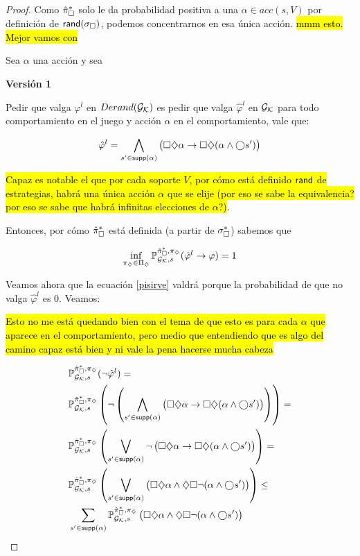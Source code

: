 \begin{proof}
	Como $\hat{\pi}_{\square}^{*}$ solo le da probabilidad positiva a una $\alpha \in acc(s, V)$
	por definición de $\textsf{rand}(\sigma_\square)$, podemos concentrarnos en esa única
	acción. \hl{mmm esto. Mejor vamos con}

	Sea $\alpha$ una acción y sea

	\textbf{Versión 1}

	Pedir que valga $\varphi^l$ en $Derand(\mathcal{G}_{\mathcal{K}})$ es pedir que valga $\hat{\varphi}^l$ en
	$\mathcal{G}_{\mathcal{K}}$ para todo comportamiento en el juego y acción $\alpha$ en el
	comportamiento, vale que:

	$$
		\hat{\varphi}^l = \bigwedge_{s' \in \textsf{supp}(\alpha)} \left( \square \diamondsuit \alpha \rightarrow \square \diamondsuit (\alpha \wedge \bigcirc s' ) \right)
	$$

	\hl{Capaz es notable el que por cada soporte $V$, por cómo está definido $\textsf{rand}$ de estrategias, habrá una única acción $\alpha$ que se elije (por eso se sabe la equivalencia? por eso se sabe que habrá infinitas elecciones de $\alpha$?)}.

	Entonces, por cómo $\hat{\pi}_{\square}^{*}$ está definida (a partir de $\sigma_\square^*$)
	sabemos que

	\begin{equation}
		\label{implicancia}
		\inf_{\pi_\diamondsuit \in \Pi_\diamondsuit} \mathbb{P}_{\mathcal{G}_{\mathcal{K}},s}^{\hat{\pi}_{\square}^{*}, \pi_\diamondsuit}(\hat{\varphi}^l \rightarrow \varphi) = 1
	\end{equation}

	Veamos ahora que la ecuación \ref{pisirve} valdrá porque la probabilidad de que
	no valga $\hat{\varphi}^l$ es 0. Veamos:

	\hl{Esto no me está quedando bien con el tema de que esto es para cada $\alpha$ que aparece en el comportamiento, pero medio que entendiendo que es algo del camino capaz está bien y ni vale la pena hacerse mucha cabeza}

	\begin{align*}
		&\mathbb{P}_{\mathcal{G}_{\mathcal{K}}, s}^{\hat{\pi}_{\square}^{*}, \pi_\diamondsuit}(\neg \hat{\varphi}^l) = \\
		&\mathbb{P}_{\mathcal{G}_{\mathcal{K}}, s}^{\hat{\pi}_{\square}^{*}, \pi_\diamondsuit}\left(\neg \left(\bigwedge_{s' \in \textsf{supp}(\alpha)} \left( \square \diamondsuit \alpha \rightarrow \square \diamondsuit (\alpha \wedge \bigcirc s' ) \right)\right)\right) = \\
		&\mathbb{P}_{\mathcal{G}_{\mathcal{K}}, s}^{\hat{\pi}_{\square}^{*}, \pi_\diamondsuit} \left(\bigvee_{s' \in \textsf{supp}(\alpha)} \neg \left( \square \diamondsuit \alpha \rightarrow \square \diamondsuit (\alpha \wedge \bigcirc s' ) \right)\right) = \\
		&\mathbb{P}_{\mathcal{G}_{\mathcal{K}}, s}^{\hat{\pi}_{\square}^{*}, \pi_\diamondsuit} \left(\bigvee_{s' \in \textsf{supp}(\alpha)} \left( \square \diamondsuit \alpha \wedge \diamondsuit \square \neg (\alpha \wedge \bigcirc s' ) \right)\right) \leq \\
		&\sum_{s' \in \textsf{supp}(\alpha)} \mathbb{P}_{\mathcal{G}_{\mathcal{K}}, s}^{\hat{\pi}_{\square}^{*}, \pi_\diamondsuit} \left( \square \diamondsuit \alpha \wedge \diamondsuit \square \neg (\alpha \wedge \bigcirc s' ) \right)
	\end{align*}


\end{proof}
